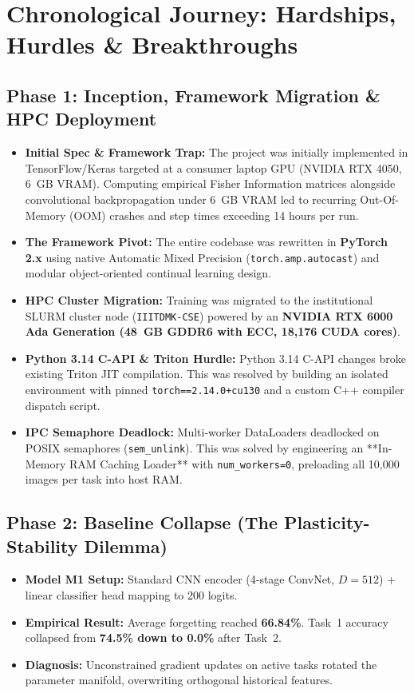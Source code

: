 \documentclass[11pt,a4paper]{article}
\begin{document}
\newpage

\section{Chronological Journey: Hardships, Hurdles \& Breakthroughs}
\label{sec:chronology}

\subsection{Phase 1: Inception, Framework Migration \& HPC Deployment}
\begin{itemize}[leftmargin=*]
    \item \textbf{Initial Spec \& Framework Trap:} The project was initially implemented in TensorFlow/Keras targeted at a consumer laptop GPU (NVIDIA RTX 4050, 6~GB VRAM). Computing empirical Fisher Information matrices alongside convolutional backpropagation under 6~GB VRAM led to recurring Out-Of-Memory (OOM) crashes and step times exceeding 14 hours per run.
    \item \textbf{The Framework Pivot:} The entire codebase was rewritten in \textbf{PyTorch 2.x} using native Automatic Mixed Precision (\texttt{torch.amp.autocast}) and modular object-oriented continual learning design.
    \item \textbf{HPC Cluster Migration:} Training was migrated to the institutional SLURM cluster node (\texttt{IIITDMK-CSE}) powered by an \textbf{NVIDIA RTX 6000 Ada Generation (48~GB GDDR6 with ECC, 18,176 CUDA cores)}.
    \item \textbf{Python 3.14 C-API \& Triton Hurdle:} Python 3.14 C-API changes broke existing Triton JIT compilation. This was resolved by building an isolated environment with pinned \texttt{torch==2.14.0+cu130} and a custom C++ compiler dispatch script.
    \item \textbf{IPC Semaphore Deadlock:} Multi-worker DataLoaders deadlocked on POSIX semaphores (\texttt{sem_unlink}). This was solved by engineering an **In-Memory RAM Caching Loader** with \texttt{num_workers=0}, preloading all 10,000 images per task into host RAM.
\end{itemize}

\subsection{Phase 2: Baseline Collapse (The Plasticity-Stability Dilemma)}
\begin{itemize}[leftmargin=*]
    \item \textbf{Model M1 Setup:} Standard CNN encoder (4-stage ConvNet, $D=512$) + linear classifier head mapping to 200 logits.
    \item \textbf{Empirical Result:} Average forgetting reached \textbf{66.84\%}. Task~1 accuracy collapsed from \textbf{74.5\% down to 0.0\%} after Task~2.
    \item \textbf{Diagnosis:} Unconstrained gradient updates on active tasks rotated the parameter manifold, overwriting orthogonal historical features.
\end{itemize}
\end{document}
